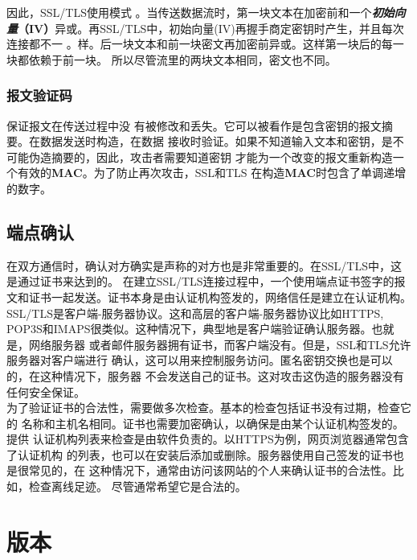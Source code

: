 \documentclass[11pt,dvips]{article}
\begin{document}
因此，SSL/TLS使用{}模式
。当传送数据流时，第一块文本在加密前和一个\textbf{{\slshape{初始向量}}{（IV）}}异或。再SSL/TLS中，初始向量(IV)再握手商定密钥时产生，并且每次连接都不一
。样。后一块文本和前一块密文再加密前异或。这样第一块后的每一块都依赖于前一块。
所以尽管流里的两块文本相同，密文也不同。\\

\subsubsection{报文验证码}

{}保证报文在传送过程中没
有被修改和丢失。它可以被看作是包含密钥的报文摘要。在数据发送时构造，在数据
接收时验证。如果不知道输入文本和密钥，是不可能伪造摘要的，因此，攻击者需要知道密钥
才能为一个改变的报文重新构造一个有效的{\bf{MAC}}。为了防止再次攻击，SSL和TLS
在构造{\bf{MAC}}时包含了单调递增的数字。

\subsection{端点确认}

 在双方通信时，确认对方确实是声称的对方也是非常重要的。在SSL/TLS中，这是通过证书来达到的。
 在建立SSL/TLS连接过程中，一个使用端点证书签字的报文和证书一起发送。证书本身是由认证机构签发的，网络信任是建立在认证机构。\\

 SSL/TLS是客户端-服务器协议。这和高层的客户端-服务器协议比如HTTPS,
 POP3S和IMAPS很类似。这种情况下，典型地是客户端验证确认服务器。也就是，网络服务器
 或者邮件服务器拥有证书，而客户端没有。但是，SSL和TLS允许服务器对客户端进行
 确认，这可以用来控制服务访问。匿名密钥交换也是可以的，在这种情况下，服务器
 不会发送自己的证书。这对攻击这伪造的服务器没有任何安全保证。 \\

 为了验证证书的合法性，需要做多次检查。基本的检查包括证书没有过期，检查它的
 名称和主机名相同。证书也需要加密确认，以确保是由某个认证机构签发的。提供
 认证机构列表来检查是由软件负责的。以HTTPS为例，网页浏览器通常包含了认证机构
 的列表，也可以在安装后添加或删除。服务器使用自己签发的证书也是很常见的，在
 这种情况下，通常由访问该网站的个人来确认证书的合法性。比如，检查离线足迹。
尽管通常希望它是合法的。

\section{版本}
\end{document}

